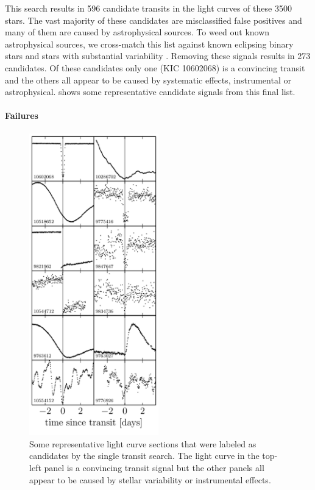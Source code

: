 This search results in 596 candidate transits in the light curves of these
3500 stars.
The vast majority of these candidates are misclassified false positives and
many of them are caused by astrophysical sources.
To weed out known astrophysical sources, we cross-match this list against
known eclipsing binary stars \citep{Matijevic:2012} and stars with substantial
variability \citep{McQuillan:2014}.
Removing these signals results in 273 candidates.
Of these candidates only one (KIC 10602068) is a convincing transit and the
others all appear to be caused by systematic effects, instrumental or
astrophysical.
 shows some representative candidate signals from this final
list.

\paragraph{Failures}



\begin{figure}[p]
\begin{center}
\includegraphics[width=0.5\textwidth]{figures/peerless/candidates.pdf}
\end{center}
\caption{%
Some representative light curve sections that were labeled as candidates by
the single transit search.
The light curve in the top-left panel is a convincing transit signal but the
other panels all appear to be caused by stellar variability or instrumental
effects.
}
\end{figure}



